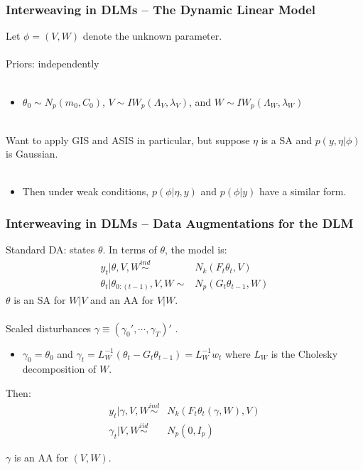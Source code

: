 \documentclass[xcolor=dvipsnames]{beamer}
\begin{document}
\begin{frame}
  \frametitle{Interweaving in DLMs -- The Dynamic Linear Model} 
Let $\phi=(V,W)$ denote the unknown parameter.\\~\\

Priors: independently \\~\\
\begin{itemize}
\item[]$\theta_0\sim N_p(m_0,C_0)$, $V\sim IW_p(\Lambda_V,\lambda_V)$, and $W\sim IW_p(\Lambda_W,\lambda_W)$\\~\\
\end{itemize}

\pause Want to apply GIS and ASIS in particular, but suppose $\eta$ is a SA and $p(y,\eta|\phi)$ is Gaussian.\\~
\begin{itemize}
\item[] Then under weak conditions, $p(\phi|\eta,y)$ and $p(\phi|y)$ have a similar form.
\end{itemize}

\end{frame}

\begin{frame}
\frametitle{Interweaving in DLMs -- Data Augmentations for the DLM}
Standard DA: states $\theta$. In terms of $\theta$, the model is:
\begin{align*}
y_t|\theta,V,W \stackrel{ind}{\sim} & N_k(F_t\theta_t,V)\\ 
\theta_t|\theta_{0:(t-1)},V,W \sim & N_p(G_t\theta_{t-1},W)
\end{align*} 
{\color{blue}$\theta$ is an SA for $W|V$ and an AA for $V|W$.}\\~\\

\pause Scaled disturbances $\gamma\equiv(\gamma_0',\cdots,\gamma_T)'$ \citep{fruhwirth2004efficient}.
\begin{itemize}
\item[]$\gamma_0=\theta_0$ and $\gamma_t=L_W^{-1}(\theta_t - G_t\theta_{t-1})=L_W^{-1}w_t$ where $L_W$ is the Cholesky decomposition of $W$.
\end{itemize}
Then:
\begin{align*}
y_t|\gamma,V,W \stackrel{ind}{\sim} & N_k(F_t\theta_t(\gamma,W),V) \\
\gamma_t|V,W \stackrel{iid}{\sim} & N_p(0,I_p)
\end{align*} 

{\color{blue}$\gamma$ is an AA for $(V,W)$.}

\end{frame}
\end{document}

